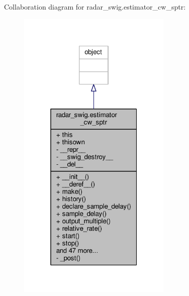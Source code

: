 Collaboration diagram for radar\+\_\+swig.\+estimator\+\_\+cw\+\_\+sptr\+:
\nopagebreak
\begin{figure}[H]
\begin{center}
\leavevmode
\includegraphics[width=208pt]{dd/dc8/classradar__swig_1_1estimator__cw__sptr__coll__graph}
\end{center}
\end{figure}
